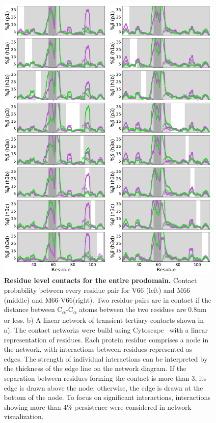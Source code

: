 \documentclass[10pt,letterpaper]{article}
\begin{document}
\begin{figure}[!ht]
\includegraphics[scale=0.5,width=\textwidth,trim={0 0cm 0 0cm},clip]{./figures/S11.pdf}
\caption{{\bf Residue level contacts for the entire prodomain.} Contact probability between every residue pair for V66 (left) and M66 (middle) and M66-V66(right). Two residue pairs are in contact if the distance between C\textsubscript{$\alpha$}-C\textsubscript{$\alpha$} atoms between the two residues are 0.8nm or less. b)  A linear network of transient tertiary contacts shown in a). The contact networks were build using Cytoscape~\cite{Ahlstrom2013} with a linear representation of residues. Each protein residue comprises a node in the network, with interactions between residues represented as edges. The strength of individual interactions can be interpreted by the thickness of the edge line on the network diagram. If the separation between residues forming the contact is more than 3, its edge is drawn above the node; otherwise, the edge is drawn at the bottom of the node. To focus on significant interactions, interactions showing more than 4\% persistence were considered in network visualization.}
\label{S11} 
\end{figure}
\end{document}
